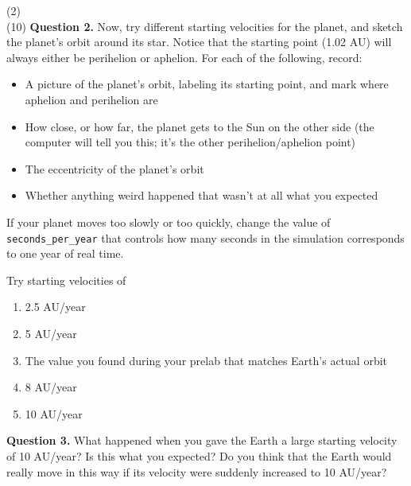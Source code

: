 \documentclass[11pt]{article}
\begin{document}
\vspace{1.5cm}
(2) \hrulefill\\


(10) \textbf{Question 2.} Now, try different starting velocities for the planet, and sketch the planet's orbit around its star. Notice that the starting point (1.02 AU) will always either be perihelion or aphelion. For each of the following, record:

\begin{itemize}

\item A picture of the planet's orbit, labeling its starting point, and mark where aphelion and perihelion are

\item How close, or how far, the planet gets to the Sun on the other side (the computer will tell you this; it's the other perihelion/aphelion point)

\item The eccentricity of the planet's orbit

\item Whether anything weird happened that wasn't at all what you expected

\end{itemize}


If your planet moves too slowly or too quickly, change the value of {\tt seconds\_per\_year} that controls how many seconds in the simulation corresponds to one year of real time.


\newpage
Try starting velocities of


\begin{enumerate}
	\item 2.5 AU/year
	\vspace{1.5in}
	\item 5 AU/year
	\vspace{1.5in}
	\item The value you found during your prelab that matches Earth's actual orbit
	\vspace{1.5in}
	\item 8 AU/year
	\vspace{1.5in}
	\item 10 AU/year
	
\end{enumerate}

\newpage

\textbf{Question 3.} What happened when you gave the Earth a large starting velocity of 10 AU/year? Is this what you expected? Do you think that the Earth would really move in this way if its velocity were suddenly increased to 10 AU/year?
\end{document}
